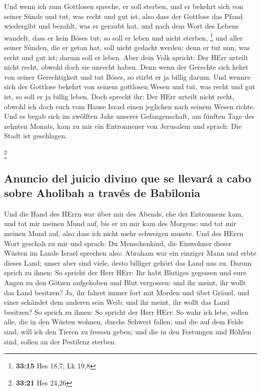  Und wenn ich zum Gottlosen spreche, er soll sterben, und
er bekehrt sich von seiner Sünde und tut, was recht und gut ist,
 also dass der Gottlose das Pfand wiedergibt und bezahlt,
was er geraubt hat, und nach dem Wort des Lebens wandelt, dass er kein
Böses tut: so soll er leben und nicht sterben, \footnote{\textbf{33:15}
  Hes 18,7; Lk 19,8}  und aller seiner Sünden, die er
getan hat, soll nicht gedacht werden; denn er tut nun, was recht und gut
ist; darum soll er leben.  Aber dein Volk spricht: Der
HErr urteilt nicht recht, obwohl doch sie unrecht haben. 
Denn wenn der Gerechte sich kehrt von seiner Gerechtigkeit und tut
Böses, so stirbt er ja billig darum.  Und wennre sich der
Gottlose bekehrt von seinem gottlosen Wesen und tut, was recht und gut
ist, so soll er ja billig leben.  Doch sprecht ihr: Der
HErr urteilt nicht recht, obwohl ich doch euch vom Hause Israel einen
jeglichen nach seinem Wesen richte.  Und es begab sich im
zwölften Jahr unserer Gefangenschaft, am fünften Tage des zehnten
Monats, kam zu mir ein Entronnener von Jerusalem und sprach: Die Stadt
ist geschlagen.

\footnote{\textbf{33:21} Hes 24,26}

\hypertarget{anuncio-del-juicio-divino-que-se-llevaruxe1-a-cabo-sobre-aholibah-a-travuxe9s-de-babilonia}{%
\subsection{Anuncio del juicio divino que se llevará a cabo sobre
Aholibah a través de
Babilonia}\label{anuncio-del-juicio-divino-que-se-llevaruxe1-a-cabo-sobre-aholibah-a-travuxe9s-de-babilonia}}

 Und die Hand des HErrn war über mir des Abends, ehe der
Entronnene kam, und tat mir meinen Mund auf, bis er zu mir kam des
Morgens; und tat mir meinen Mund auf, also dass ich nicht mehr schweigen
musste.  Und des HErrn Wort geschah zu mir und sprach:
 Du Menschenkind, die Einwohner dieser Wüsten im Lande
Israel sprechen also: Abraham war ein einziger Mann und erbte dieses
Land; unser aber sind viele, desto billiger gehört das Land uns zu.
 Darum sprich zu ihnen: So spricht der Herr HErr: Ihr
habt Blutiges gegessen und eure Augen zu den Götzen aufgehoben und Blut
vergossen: und ihr meint, ihr wollt das Land besitzen? 
Ja, ihr fahret immer fort mit Morden und übet Gräuel, und einer schändet
dem anderen sein Weib; und ihr meint, ihr wollt das Land besitzen?
 So sprich zu ihnen: So spricht der Herr HErr: So wahr
ich lebe, sollen alle, die in den Wüsten wohnen, durchs Schwert fallen;
und die auf dem Felde sind, will ich den Tieren zu fressen geben; und
die in den Festungen und Höhlen sind, sollen an der Pestilenz sterben.

